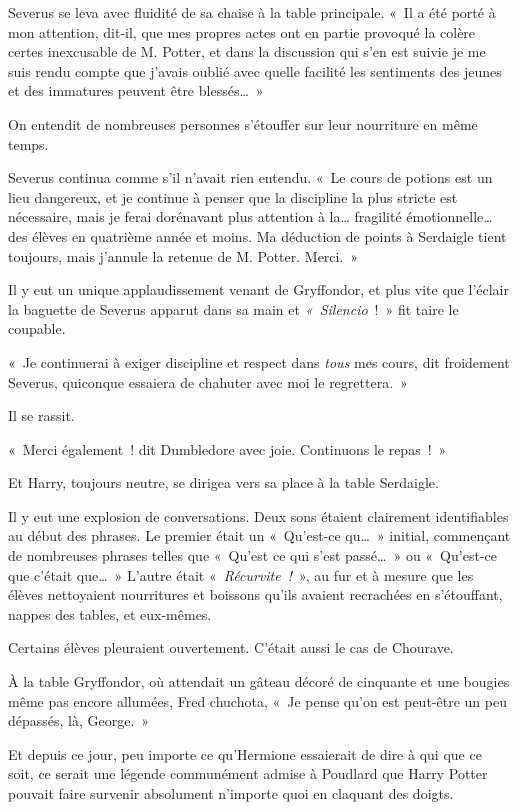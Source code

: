 Severus se leva avec fluidité de sa chaise à la table principale.
«~Il a été porté à mon attention, dit-il, que mes propres actes ont en partie provoqué la colère certes inexcusable de M. Potter, et dans la discussion qui s'en est suivie je me suis rendu compte que j'avais oublié avec quelle facilité les sentiments des jeunes et des immatures peuvent être blessés…~»

On entendit de nombreuses personnes s'étouffer sur leur nourriture en même temps.

Severus continua comme s'il n'avait rien entendu.
«~Le cours de potions est un lieu dangereux, et je continue à penser que la discipline la plus stricte est nécessaire, mais je ferai dorénavant plus attention à la… fragilité émotionnelle… des élèves en quatrième année et moins.
Ma déduction de points à Serdaigle tient toujours, mais j'annule la retenue de M. Potter.
Merci.~»

Il y eut un unique applaudissement venant de Gryffondor, et plus vite que l'éclair la baguette de Severus apparut dans sa main et \emph{«~Silencio}~!~»
fit taire le coupable.

«~Je continuerai à exiger discipline et respect dans \emph{tous} mes cours, dit froidement Severus, quiconque essaiera de chahuter avec moi le regrettera.~»

Il se rassit.

«~Merci également~! dit Dumbledore avec joie.
Continuons le repas~!~»

Et Harry, toujours neutre, se dirigea vers sa place à la table Serdaigle.

Il y eut une explosion de conversations.
Deux sons étaient clairement identifiables au début des phrases.
Le premier était un «~Qu'est-ce qu…~» initial, commençant de nombreuses phrases telles que «~Qu'est ce qui s'est passé…~» ou «~Qu'est-ce que c'était que…~»
L'autre était «~\emph{Récurvite~!}~», au fur et à mesure que les élèves nettoyaient nourritures et boissons qu'ils avaient recrachées en s'étouffant, nappes des tables, et eux-mêmes.

Certains élèves pleuraient ouvertement.
C'était aussi le cas de Chourave.

À la table Gryffondor, où attendait un gâteau décoré de cinquante et une bougies même pas encore allumées, Fred chuchota, «~Je pense qu'on est peut-être un peu dépassés, là, George.~»

Et depuis ce jour, peu importe ce qu'Hermione essaierait de dire à qui que ce soit, ce serait une légende communément admise à Poudlard que Harry Potter pouvait faire survenir absolument n'importe quoi en claquant des doigts.~
